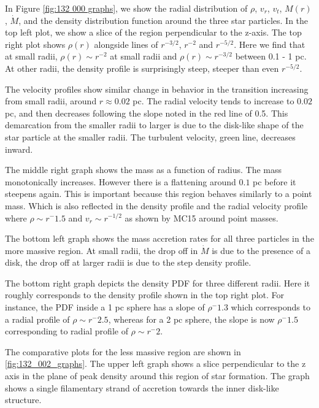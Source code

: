 \documentclass{emulateapj}
\begin{document}
In Figure \ref{fig:132 000 graphs}, we show the radial distribution of $\rho$, $v_r$, $v_t$, $M(r)$, $\dot{M}$, and the density distribution function around the three star particles.  In the top left plot, we show a slice of the region perpendicular to the z-axis.  The top right plot shows $\rho(r)$ alongside lines of $r^{-3/2}$, $r^{-2}$ and $r^{-5/2}$.  Here we find that at small radii, $\rho(r)\sim r^{-2}$ at small radii and $\rho(r) \sim r^{-3/2}$ between 0.1 - 1 pc. At other radii, the density profile is surprisingly steep, steeper than even $r^{-5/2}$.

The velocity profiles show similar change in behavior in the transition increasing from small radii, around $r\approx 0.02$ pc.  The radial velocity tends to increase to $0.02$ pc, and then decreases following the slope noted in the red line of 0.5.  This demarcation from the smaller radii to larger is due to the disk-like shape of the star particle at the smaller radii.  The turbulent velocity, green line, decreases inward.  

The middle right graph shows the mass as a function of radius.  The mass monotonically increases.  However there is a flattening around $0.1$ pc before it steepens again.  This is important because this region behaves similarly to a point mass.  Which is also reflected in the density profile and the radial velocity profile where $\rho \sim r^-1.5$ and $v_r \sim r^{-1/2}$ as shown by MC15 around point masses.  

The bottom left graph shows the mass accretion rates for all three particles in the more massive region.  At small radii, the drop off in $\dot M$ is due to the presence of a disk, the drop off at larger radii is due to the step density profile.  

The bottom right graph depicts the density PDF for three different radii.  Here it roughly corresponds to the density profile shown in the top right plot.  For instance, the PDF inside a 1 pc sphere has a slope of $\rho ^-1.3$ which corresponds to a radial profile of $\rho \sim r^-2.5$, whereas for a 2 pc sphere, the slope is now $\rho ^-1.5$ corresponding to radial profile of $\rho \sim r^-2$.  

The comparative plots for the less massive region are shown in \ref{fig:132_002_graphs}.  The upper left graph shows a slice perpendicular to the z axis in the plane of peak density around this region of star formation.  The graph shows a single filamentary strand of accretion towards the inner disk-like structure.  
\end{document}
